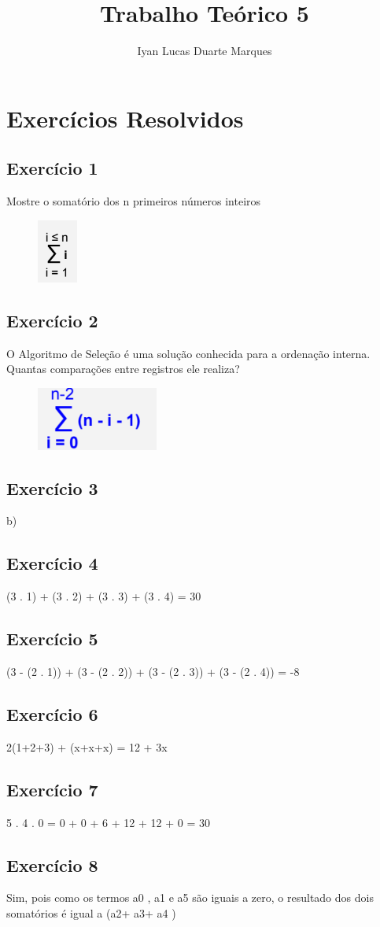 \documentclass[12pt]{article}
\title{Trabalho Teórico 5}
\author{Iyan Lucas Duarte Marques}
\begin{document}
\maketitle
\section{Exercícios Resolvidos}
\subsection{Exercício 1}
Mostre o somatório dos n primeiros números inteiros
\begin{figure}[ht]
    \includegraphics[width=50px]{1.png}
\end{figure}
\subsection{Exercício 2}
O Algoritmo de Seleção é uma solução conhecida para a ordenação
interna. Quantas comparações entre registros ele realiza?
\begin{figure}[ht]
    \includegraphics[width=4cm]{2.png}
\end{figure}
\subsection{Exercício 3}
b)
\subsection{Exercício 4}
(3 . 1) + (3 . 2) + (3 . 3) + (3 . 4) = 30
\subsection{Exercício 5}
(3 - (2 . 1)) + (3 - (2 . 2)) + (3 - (2 . 3)) + (3 - (2 . 4)) = -8
\subsection{Exercício 6}
2(1+2+3) + (x+x+x) = 12 + 3x
\subsection{Exercício 7}
5 . 4 . 0 = 0 + 0 + 6 + 12 + 12 + 0 = 30
\subsection{Exercício 8}
Sim, pois como os termos a0
, a1
e a5
são iguais a zero, o resultado dos dois somatórios é igual a (a2+ a3+ a4
)
\end{document}
